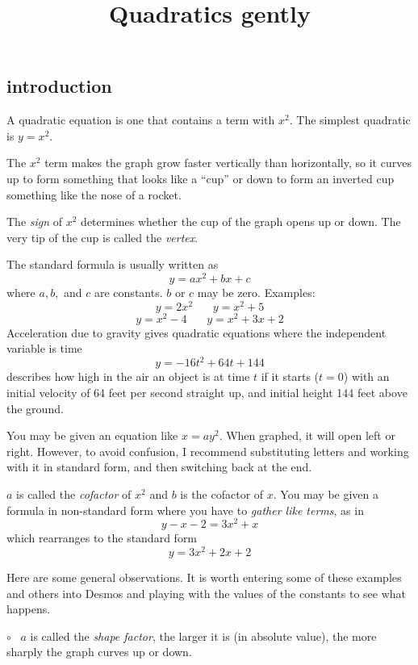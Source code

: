 \documentclass[11pt, oneside]{article}
\title{Quadratics gently}
\date{}
\begin{document}
\maketitle
\Large


\subsection*{introduction}

A quadratic equation is one that contains a term with $x^2$.  The simplest quadratic is $y = x^2$. 

The $x^2$ term makes the graph grow faster vertically than horizontally, so it curves up to form something that looks like a ``cup'' or down to form an inverted cup something like the nose of a rocket.  

The \emph{sign} of $x^2$ determines whether the cup of the graph opens up or down.  The very tip of the cup is called the \emph{vertex}.

The standard formula is usually written as
\[ y = ax^2 + bx + c \]
where $a,b,$ and $c$ are constants.  $b$ or $c$ may be zero.  Examples:
\[ y = 2x^2 \ \ \ \ \ \ \ \  y = x^2 + 5 \]
\[ y = x^2 - 4 \ \ \ \ \ \ \ \   y = x^2 + 3x + 2 \]
Acceleration due to gravity gives quadratic equations where the independent variable is time
\[ y = -16t^2 + 64t + 144 \]
describes how high in the air an object is at time $t$ if it starts ($t = 0$) with an initial velocity of 64 feet per second straight up, and initial height 144 feet above the ground.

You may be given an equation like $x = ay^2$.  When graphed, it will open left or right.  However, to avoid confusion, I recommend substituting letters and working with it in standard form, and then switching back at the end.

$a$ is called the \emph{cofactor} of $x^2$ and $b$ is the cofactor of $x$.  You may be given a formula in non-standard form where you have to \emph{gather like terms}, as in
\[ y - x - 2 = 3x^2 + x \]
which rearranges to the standard form 
\[ y = 3x^2 + 2x + 2 \]

Here are some general observations.  It is worth entering some of these examples and others into Desmos and playing with the values of the constants to see what happens.

$\circ$ \ $a$ is called the \emph{shape factor}, the larger it is (in absolute value), the more sharply the graph curves up or down.
\end{document}
